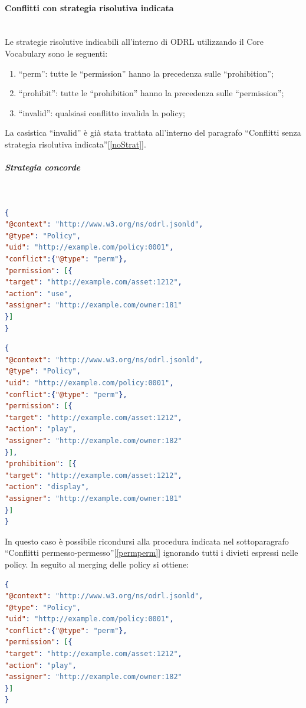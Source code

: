 \documentclass[12pt,a4paper,twoside]{book}
\begin{document}
\paragraph{Conflitti con strategia risolutiva indicata}\mbox{}\\
Le strategie risolutive indicabili all'interno di ODRL utilizzando il Core Vocabulary sono le seguenti:
\begin{enumerate}
	\item ``perm'': tutte le ``permission'' hanno la precedenza sulle ``prohibition'';
	\item ``prohibit'': tutte le ``prohibition'' hanno la precedenza sulle ``permission'';
	\item ``invalid'': qualsiasi conflitto invalida la policy;
\end{enumerate}
La casistica ``invalid'' è già stata trattata all'interno del paragrafo ``Conflitti senza strategia risolutiva indicata''[\ref{noStrat}].\newpage
\subparagraph{Strategia concorde}\mbox{}\\
\begin{lstlisting}[language=json,firstnumber=1,caption={La policy 0001 consente qualsiasi utilizzo dell'asset 1212 a chiunque, dando precedenza ai permessi in caso di conflitto},captionpos=b]
{
"@context": "http://www.w3.org/ns/odrl.jsonld",
"@type": "Policy",
"uid": "http://example.com/policy:0001",
"conflict":{"@type": "perm"},
"permission": [{
"target": "http://example.com/asset:1212",
"action": "use",
"assigner": "http://example.com/owner:181"
}]
}
\end{lstlisting}
\begin{lstlisting}[language=json,firstnumber=1,caption={La policy 0002 permette la riproduzione dell'asset 1212 a chiunque, mentre ne vieta la proiezione, dando precedenza ai permessi in caso di conflitto},captionpos=b]
{
"@context": "http://www.w3.org/ns/odrl.jsonld",
"@type": "Policy",
"uid": "http://example.com/policy:0001",
"conflict":{"@type": "perm"},
"permission": [{
"target": "http://example.com/asset:1212",
"action": "play",
"assigner": "http://example.com/owner:182"
}],
"prohibition": [{
"target": "http://example.com/asset:1212",
"action": "display",
"assigner": "http://example.com/owner:181"
}]
}
\end{lstlisting}
In questo caso è possibile ricondursi alla procedura indicata nel sottoparagrafo ``Conflitti permesso-permesso''[\ref{permperm}] ignorando tutti i divieti espressi nelle policy. In seguito al merging delle policy si ottiene:
\begin{lstlisting}[language=json,firstnumber=1,caption={La policy 0003 risulta essere uguale ai permessi della policy 0002, più restrittiva},captionpos=b]
{
"@context": "http://www.w3.org/ns/odrl.jsonld",
"@type": "Policy",
"uid": "http://example.com/policy:0001",
"conflict":{"@type": "perm"},
"permission": [{
"target": "http://example.com/asset:1212",
"action": "play",
"assigner": "http://example.com/owner:182"
}]
}
\end{lstlisting}
\end{document}
